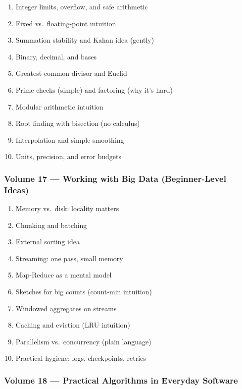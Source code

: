 \documentclass[
  letterpaper,
  DIV=11,
  numbers=noendperiod]{scrreprt}
\providecommand{\tightlist}{%
  \setlength{\itemsep}{0pt}\setlength{\parskip}{0pt}}
\begin{document}
\begin{enumerate}
\def\labelenumi{\arabic{enumi}.}
\setcounter{enumi}{150}
\tightlist
\item
  Integer limits, overflow, and safe arithmetic
\item
  Fixed vs.~floating-point intuition
\item
  Summation stability and Kahan idea (gently)
\item
  Binary, decimal, and bases
\item
  Greatest common divisor and Euclid
\item
  Prime checks (simple) and factoring (why it's hard)
\item
  Modular arithmetic intuition
\item
  Root finding with bisection (no calculus)
\item
  Interpolation and simple smoothing
\item
  Units, precision, and error budgets
\end{enumerate}

\subsubsection{Volume 17 --- Working with Big Data (Beginner-Level
Ideas)}\label{volume-17-working-with-big-data-beginner-level-ideas}

\begin{enumerate}
\def\labelenumi{\arabic{enumi}.}
\setcounter{enumi}{160}
\tightlist
\item
  Memory vs.~disk: locality matters
\item
  Chunking and batching
\item
  External sorting idea
\item
  Streaming: one pass, small memory
\item
  Map-Reduce as a mental model
\item
  Sketches for big counts (count-min intuition)
\item
  Windowed aggregates on streams
\item
  Caching and eviction (LRU intuition)
\item
  Parallelism vs.~concurrency (plain language)
\item
  Practical hygiene: logs, checkpoints, retries
\end{enumerate}

\subsubsection{Volume 18 --- Practical Algorithms in Everyday
Software}\label{volume-18-practical-algorithms-in-everyday-software}
\end{document}
